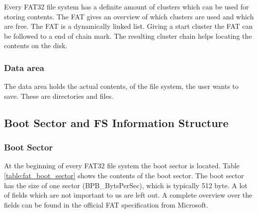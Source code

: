 Every FAT32 file system has a definite amount of clusters which can be used for storing contents. The FAT gives an overview of which clusters are used and which are free. The FAT is a dynamically linked list. Giving a start cluster the FAT can be followed to a end of chain mark. The resulting cluster chain helps locating the contents on the disk.

\subsubsection{Data area}

The data area holds the actual contents, of the file system, the user wants to save. These are directories and files.

\subsection{Boot Sector and FS Information Structure}

\subsubsection{Boot Sector}

At the beginning of every FAT32 file system the boot sector is located. Table \ref{table:fat_boot_sector} shows the contents of the boot sector. The boot sector has the size of one sector (BPB\_BytsPerSec), which is typically 512 byte. A lot of fields which are not important to us are left out. A complete overview over the fields can be found in the official FAT specification from Microsoft\cite{fatgen103}.

